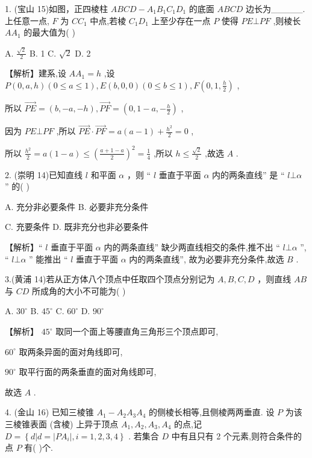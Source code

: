 \documentclass[10pt]{article}
\begin{document}
1. (宝山 15)如图，正四棱柱 \({ABCD} - {A}_{1}{B}_{1}{C}_{1}{D}_{1}\) 的底面 \({ABCD}\) 边长为\_\_\_\_\_. 上任意一点, \(F\) 为 \(C{C}_{1}\) 中点,若棱 \({C}_{1}{D}_{1}\) 上至少存在一点 \(P\) 使得 \({PE} \bot  {PF}\) ,则棱长 \(A{A}_{1}\) 的最大值为( )

A. \(\frac{\sqrt{2}}{2}\) B. 1 C. \(\sqrt{2}\) D. 2

【解析】建系,设 \(A{A}_{1} = h\) ,设 \(P\left( {0,a,h}\right) \left( {0 \leq  a \leq  1}\right) ,E\left( {b,0,0}\right) \left( {0 \leq  b \leq  1}\right) ,F\left( {0,1,\frac{h}{2}}\right)\) ,

所以 \(\overrightarrow{PE} = \left( {b, - a, - h}\right) ,\overrightarrow{PF} = \left( {0,1 - a, - \frac{h}{2}}\right)\) ,

因为 \({PE} \bot  {PF}\) ,所以 \(\overrightarrow{PE} \cdot  \overrightarrow{PF} = a\left( {a - 1}\right)  + \frac{{h}^{2}}{2} = 0\) ,

所以 \(\frac{{h}^{2}}{2} = a\left( {1 - a}\right)  \leq  {\left( \frac{a + 1 - a}{2}\right) }^{2} = \frac{1}{4}\) ,所以 \(h \leq  \frac{\sqrt{2}}{2}\) ,故选 \(A\) .

2. (崇明 14)已知直线 \(l\) 和平面 \(\alpha\) ，则 “ \(l\) 垂直于平面 \(\alpha\) 内的两条直线” 是 “ \(l \bot  \alpha\) ” 的( )

A. 充分非必要条件 B. 必要非充分条件

C. 充要条件 D. 既非充分也非必要条件

【解析】“ \(l\) 垂直于平面 \(\alpha\) 内的两条直线” 缺少两直线相交的条件,推不出 “ \(l \bot  \alpha\) ”, “ \(l \bot  \alpha\) ” 能推出 “ \(l\) 垂直于平面 \(\alpha\) 内的两条直线”, 故为必要非充分条件,故选 \(B\) .

3.(黄浦 14)若从正方体八个顶点中任取四个顶点分别记为 \(A,B,C,D\) ，则直线 \({AB}\) 与 \({CD}\) 所成角的大小不可能为( )

A. \({30}^{ \circ  }\) B. \({45}^{ \circ  }\) C. \({60}^{ \circ  }\) D. \({90}^{ \circ  }\)

【解析】 \({45}^{ \circ  }\) 取同一个面上等腰直角三角形三个顶点即可,

\({60}^{ \circ  }\) 取两条异面的面对角线即可,

\({90}^{ \circ  }\) 取平行面的两条垂直的面对角线即可,

故选 \(A\) .

4. (金山 16) 已知三棱锥 \({A}_{1} - {A}_{2}{A}_{3}{A}_{4}\) 的侧棱长相等,且侧棱两两垂直. 设 \(P\) 为该三棱锥表面 (含棱) 上异于顶点 \({A}_{1},{A}_{2},{A}_{3},{A}_{4}\) 的点,记 \(D = \left\{  {d\left| {d = }\right| P{A}_{i}\mid ,i = 1,2,3,4}\right\}\) . 若集合 \(D\) 中有且只有 2 个元素,则符合条件的点 \(P\) 有(   )个.
\end{document}
